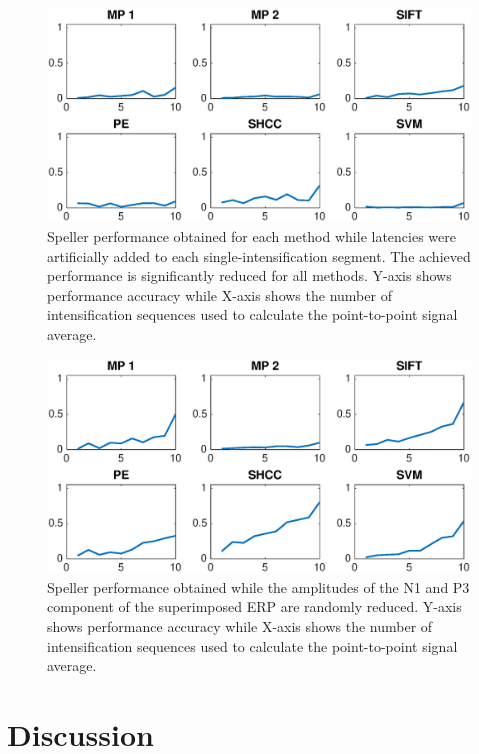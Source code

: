 \documentclass[brainsci,article,submit,moreauthors,pdftex,10pt,a4paper]{mdpi}
\begin{document}
\begin{figure}[H]
\centering
\includegraphics[width=15cm]{images/CrossPerformanceTestLatency.eps}
\caption{Speller performance obtained for each method while latencies were artificially added to each single-intensification segment.  The achieved performance is significantly reduced for all methods. Y-axis shows performance accuracy while X-axis shows the number of intensification sequences used to calculate the point-to-point signal average.}
\label{fig:performancetestlatency}
\end{figure}


\begin{figure}[H]
\centering
\includegraphics[width=15cm]{images/CrossPerformanceTestAmplitude.eps}
\caption{Speller performance obtained while the amplitudes of the N1 and P3 component of the superimposed ERP are randomly reduced. Y-axis shows performance accuracy while X-axis shows the number of intensification sequences used to calculate the point-to-point signal average.}
\label{fig:performancetestamplitude}
\end{figure}


\section{Discussion}
\label{section:discussion}
\end{document}
